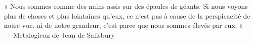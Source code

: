 \cleardoublepage
\thispagestyle{empty}


\vspace*{3cm}

\begin{raggedleft}
« Nous sommes comme des nains assis sur des épaules de géants. Si nous voyons plus de choses et plus lointaines qu’eux, ce n’est pas à cause de la perspicacité de notre vue, ni de notre grandeur, c’est parce que nous sommes élevés par eux. » \\
     --- Metalogicon de Jean de Salisbury\\
\end{raggedleft}

\vspace{4cm}




